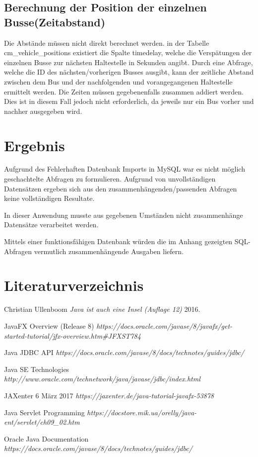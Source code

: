 \documentclass[a4paper, 12.5pt]{scrartcl}
\begin{document}
\subsection{Berechnung der Position der einzelnen Busse(Zeitabstand)}
Die Abstände müssen nicht direkt berechnet werden. in der Tabelle cm\_vehicle\_positions existiert die Spalte timedelay, welche die Verspätungen der einzelnen Busse zur nächsten Haltestelle in Sekunden angibt. Durch eine Abfrage, welche die ID des nächsten/vorherigen Busses ausgibt, kann der zeitliche Abstand zwischen dem Bus und der nachfolgenden und vorangegangenen Haltestelle ermittelt werden. Die Zeiten müssen gegebenenfalls zusammen addiert werden. Dies ist in diesem Fall jedoch nicht erforderlich, da jeweils nur ein Bus vorher und nachher ausgegeben wird.

\section{Ergebnis}
Aufgrund des Fehlerhaften Datenbank Imports in MySQL war es 
nicht möglich geschachtelte Abfragen zu formulieren. Aufgrund von unvollständigen Datensätzen ergeben sich aus den zusammenhängenden/passenden Abfragen keine vollständigen Resultate.

In dieser Anwendung musste aus gegebenen Umständen nicht zusammenhänge Datensätze verarbeitet werden.

Mittels einer funktionsfähigen Datenbank würden die im Anhang gezeigten SQL-Abfragen vermutlich zusammenhängende Ausgaben liefern.
\newpage

\section{Literaturverzeichnis}
\begin{thebibliography}{1}

   Christian Ullenboom {\em Java ist auch eine Insel (Auflage 12)} 2016.

JavaFX Overview (Release 8) {\em https://docs.oracle.com/javase/8/javafx/get-started-tutorial/jfx-overview.htm\#JFXST784}

Java JDBC API {\em https://docs.oracle.com/javase/8/docs/technotes/guides/jdbc/}

Java SE Technologies {\em http://www.oracle.com/technetwork/java/javase/jdbc/index.html}

JAXenter 6 März 2017 {\em https://jaxenter.de/java-tutorial-javafx-53878}

Java Servlet Programming {\em https://docstore.mik.ua/orelly/java-ent/servlet/ch09\_02.htm}

Oracle Java Documentation {\em https://docs.oracle.com/javase/8/docs/technotes/guides/jdbc/}

\end{thebibliography}
\end{document}
